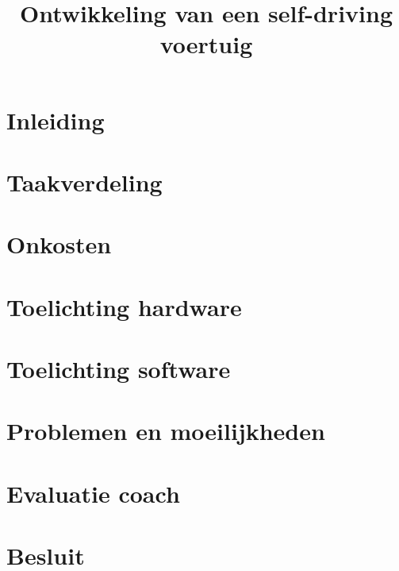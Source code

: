 \documentclass[11pt,a4paper]{report}
\title{Ontwikkeling van een self-driving voertuig}
\subtitle{}
\begin{document}
\preface
\tableofcontents

\chapter{Inleiding}\label{sec:inleiding}

\chapter{Taakverdeling}\label{sec:taakverdeling}

\chapter{Onkosten}\label{sec:onkosten}

\chapter{Toelichting hardware}\label{sec:toelichting-hardware}

\chapter{Toelichting software}\label{sec:toelichting-software}

\chapter{Problemen en moeilijkheden}\label{sec:problemen-en-moeilijkheden}

\chapter{Evaluatie coach}\label{sec:evaluatie-coach}

\chapter{Besluit}\label{sec:besluit}



\end{document}
